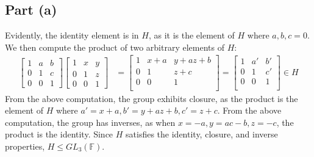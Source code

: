 \documentclass{article}
\begin{document}
\subsection*{Part (a)}
Evidently, the identity element is in $H$, as it is the element of $H$ where $a, b, c = 0$. We then compute the product of two arbitrary elements of $H$:
\begin{equation}
    \begin{split}
        \begin{bmatrix}
            1 & a & b \\
            0 & 1 & c \\
            0 & 0 & 1 
        \end{bmatrix}
        \begin{bmatrix}
            1 & x & y \\
            0 & 1 & z \\
            0 & 0 & 1 
        \end{bmatrix}
        & = 
        \begin{bmatrix}
            1 & x + a & y + az + b \\
            0 & 1 & z + c \\
            0 & 0 & 1 \\
        \end{bmatrix} = 
        \begin{bmatrix}
            1 & a' & b' \\
            0 & 1 & c' \\
            0 & 0 & 1 \\
        \end{bmatrix}\in H
    \end{split}
\end{equation}
From the above computation, the group exhibits closure, as the product is the element of $H$ where $a' = x + a, b' = y + az + b, c' = z + c$. From the above computation, the group has inverses, as when $x = -a, y = ac - b, z = -c$, the product is the identity. Since $H$ satisfies the identity, closure, and inverse properties, $H \leq GL_3\left(\mathbb{F}\right)$.
\end{document}

